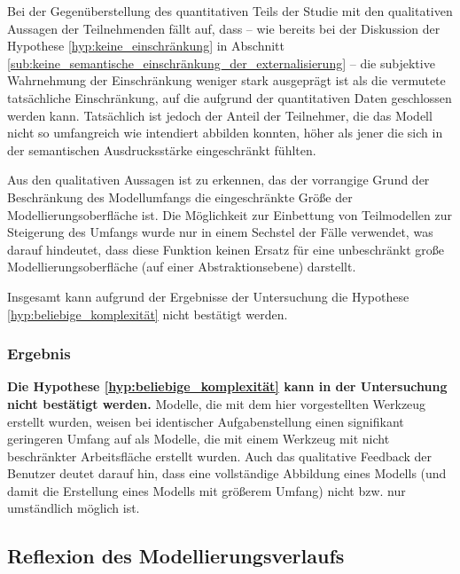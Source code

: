 Bei der Gegenüberstellung des quantitativen Teils der Studie mit den qualitativen Aussagen der Teilnehmenden fällt auf, dass -- wie bereits bei der Diskussion der Hypothese \ref{hyp:keine_einschränkung} in Abschnitt \ref{sub:keine_semantische_einschränkung_der_externalisierung} -- die subjektive Wahrnehmung der Einschränkung weniger stark ausgeprägt ist als die vermutete tatsächliche Einschränkung, auf die aufgrund der quantitativen Daten geschlossen werden kann. Tatsächlich ist jedoch der Anteil der Teilnehmer, die das Modell nicht so umfangreich wie intendiert abbilden konnten, höher als jener die sich in der semantischen Ausdrucksstärke eingeschränkt fühlten.

Aus den qualitativen Aussagen ist zu erkennen, das der vorrangige Grund der Beschränkung des Modellumfangs die eingeschränkte Größe der Modellierungsoberfläche ist. Die Möglichkeit zur Einbettung von Teilmodellen zur Steigerung des Umfangs wurde nur in einem Sechstel der Fälle verwendet, was darauf hindeutet, dass diese Funktion keinen Ersatz für eine unbeschränkt große Modellierungsoberfläche (auf einer Abstraktionsebene) darstellt.

Insgesamt kann aufgrund der Ergebnisse der Untersuchung die Hypothese \ref{hyp:beliebige_komplexität} nicht bestätigt werden.

\subsubsection{Ergebnis} %

\textbf{Die Hypothese \ref{hyp:beliebige_komplexität} kann in der Untersuchung nicht bestätigt werden.} Modelle, die mit dem hier vorgestellten Werkzeug erstellt wurden, weisen bei identischer Aufgabenstellung einen signifikant geringeren Umfang auf als Modelle, die mit einem Werkzeug mit nicht beschränkter Arbeitsfläche erstellt wurden. Auch das qualitative Feedback der Benutzer deutet darauf hin, dass eine vollständige Abbildung eines Modells (und damit die Erstellung eines Modells mit größerem Umfang) nicht bzw. nur umständlich möglich ist.



\subsection{Reflexion des Modellierungsverlaufs} %
\label{sub:reflexion_des_modellierungsverlaufs}

